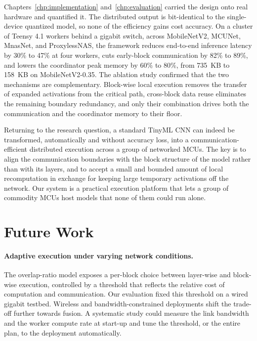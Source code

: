 Chapters~\ref{chp:implementation} and~\ref{chp:evaluation} carried the design onto real hardware and quantified it.
The distributed output is bit-identical to the single-device quantized model, so none of the efficiency gains cost accuracy.
On a cluster of Teensy 4.1 workers behind a gigabit switch, across MobileNetV2, MCUNet, MnasNet, and ProxylessNAS, the framework reduces end-to-end inference latency by 30\% to 47\% at four workers, cuts early-block communication by 82\% to 89\%, and lowers the coordinator peak memory by 60\% to 80\%, from 735~KB to 158~KB on MobileNetV2-0.35.
The ablation study confirmed that the two mechanisms are complementary.
Block-wise local execution removes the transfer of expanded activations from the critical path, cross-block data reuse eliminates the remaining boundary redundancy, and only their combination drives both the communication and the coordinator memory to their floor.

Returning to the research question, a standard TinyML CNN can indeed be transformed, automatically and without accuracy loss, into a communication-efficient distributed execution across a group of networked MCUs.
The key is to align the communication boundaries with the block structure of the model rather than with its layers, and to accept a small and bounded amount of local recomputation in exchange for keeping large temporary activations off the network.
Our system is a practical execution platform that lets a group of commodity MCUs host models that none of them could run alone.

\section{Future Work}
\label{sec:future-work}

\paragraph{Adaptive execution under varying network conditions.}
The overlap-ratio model exposes a per-block choice between layer-wise and block-wise execution, controlled by a threshold that reflects the relative cost of computation and communication.
Our evaluation fixed this threshold on a wired gigabit testbed.
Wireless and bandwidth-constrained deployments shift the trade-off further towards fusion.
A systematic study could measure the link bandwidth and the worker compute rate at start-up and tune the threshold, or the entire plan, to the deployment automatically.

